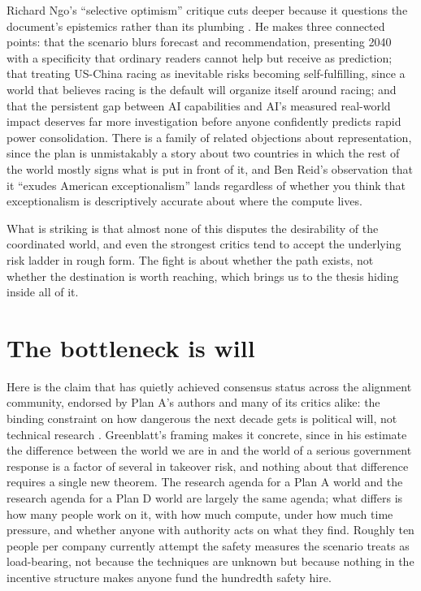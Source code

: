 \documentclass[11pt,letterpaper]{article}
\begin{document}
Richard Ngo's ``selective optimism'' critique cuts deeper because it questions the document's epistemics rather than its plumbing \citep{ngo}. He makes three connected points: that the scenario blurs forecast and recommendation, presenting 2040 with a specificity that ordinary readers cannot help but receive as prediction; that treating US-China racing as inevitable risks becoming self-fulfilling, since a world that believes racing is the default will organize itself around racing; and that the persistent gap between AI capabilities and AI's measured real-world impact deserves far more investigation before anyone confidently predicts rapid power consolidation. There is a family of related objections about representation, since the plan is unmistakably a story about two countries in which the rest of the world mostly signs what is put in front of it, and Ben Reid's observation that it ``exudes American exceptionalism'' lands regardless of whether you think that exceptionalism is descriptively accurate about where the compute lives.

What is striking is that almost none of this disputes the desirability of the coordinated world, and even the strongest critics tend to accept the underlying risk ladder in rough form. The fight is about whether the path exists, not whether the destination is worth reaching, which brings us to the thesis hiding inside all of it.

\section{The bottleneck is will}

Here is the claim that has quietly achieved consensus status across the alignment community, endorsed by Plan A's authors and many of its critics alike: the binding constraint on how dangerous the next decade gets is political will, not technical research \citep{bottleneck}. Greenblatt's framing makes it concrete, since in his estimate the difference between the world we are in and the world of a serious government response is a factor of several in takeover risk, and nothing about that difference requires a single new theorem. The research agenda for a Plan A world and the research agenda for a Plan D world are largely the same agenda; what differs is how many people work on it, with how much compute, under how much time pressure, and whether anyone with authority acts on what they find. Roughly ten people per company currently attempt the safety measures the scenario treats as load-bearing, not because the techniques are unknown but because nothing in the incentive structure makes anyone fund the hundredth safety hire.
\end{document}
